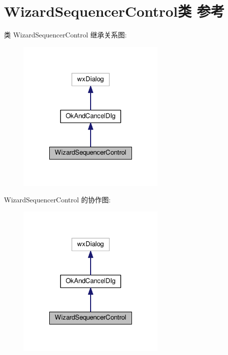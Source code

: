 \hypertarget{class_wizard_sequencer_control}{\section{Wizard\+Sequencer\+Control类 参考}
\label{class_wizard_sequencer_control}
}


类 Wizard\+Sequencer\+Control 继承关系图\+:
\nopagebreak
\begin{figure}[H]
\begin{center}
\leavevmode
\includegraphics[width=204pt]{class_wizard_sequencer_control__inherit__graph}
\end{center}
\end{figure}


Wizard\+Sequencer\+Control 的协作图\+:
\nopagebreak
\begin{figure}[H]
\begin{center}
\leavevmode
\includegraphics[width=204pt]{class_wizard_sequencer_control__coll__graph}
\end{center}
\end{figure}
